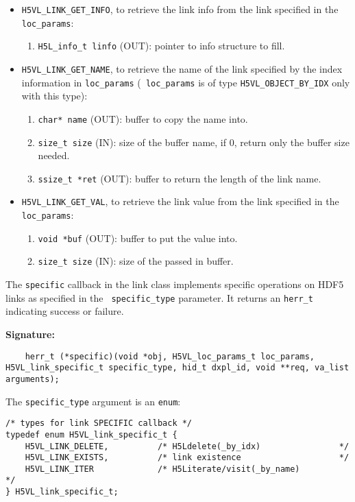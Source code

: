 \begin{itemize}
\item {\tt H5VL\_LINK\_GET\_INFO}, to retrieve the link info from the
  link specified in the {\tt loc\_params}:
  \begin{enumerate}
  \item {\tt H5L\_info\_t linfo} (OUT): pointer to info structure to
    fill.
  \end{enumerate}

\item {\tt H5VL\_LINK\_GET\_NAME}, to retrieve the name of the link
  specified by the index information in {\tt loc\_params} ({\tt
    loc\_params} is of type {\tt H5VL\_OBJECT\_BY\_IDX} only with this
  type):
  \begin{enumerate}
  \item {\tt char* name} (OUT): buffer to copy the name into.
  \item {\tt size\_t size} (IN): size of the buffer name, if 0, return
    only the buffer size needed.
  \item {\tt ssize\_t *ret} (OUT): buffer to return the length of the
    link name.
  \end{enumerate}

\item {\tt H5VL\_LINK\_GET\_VAL}, to retrieve the link value from the
  link specified in the {\tt loc\_params}:
  \begin{enumerate}
  \item {\tt void *buf} (OUT): buffer to put the value into.
  \item {\tt size\_t size} (IN): size of the passed in buffer.
  \end{enumerate}
\end{itemize}

The {\tt specific} callback in the link class implements specific operations on HDF5 links as specified in the {\tt
  specific\_type} parameter. It returns an {\tt herr\_t} indicating success or failure.

\textbf{Signature:}
\begin{lstlisting}
	herr_t (*specific)(void *obj, H5VL_loc_params_t loc_params, H5VL_link_specific_t specific_type, hid_t dxpl_id, void **req, va_list arguments);
\end{lstlisting}

The {\tt specific\_type} argument is an {\tt enum}:
\begin{lstlisting}
/* types for link SPECIFIC callback */
typedef enum H5VL_link_specific_t {
    H5VL_LINK_DELETE,          /* H5Ldelete(_by_idx)                */
    H5VL_LINK_EXISTS,          /* link existence                    */
    H5VL_LINK_ITER             /* H5Literate/visit(_by_name)              */
} H5VL_link_specific_t;
\end{lstlisting}

